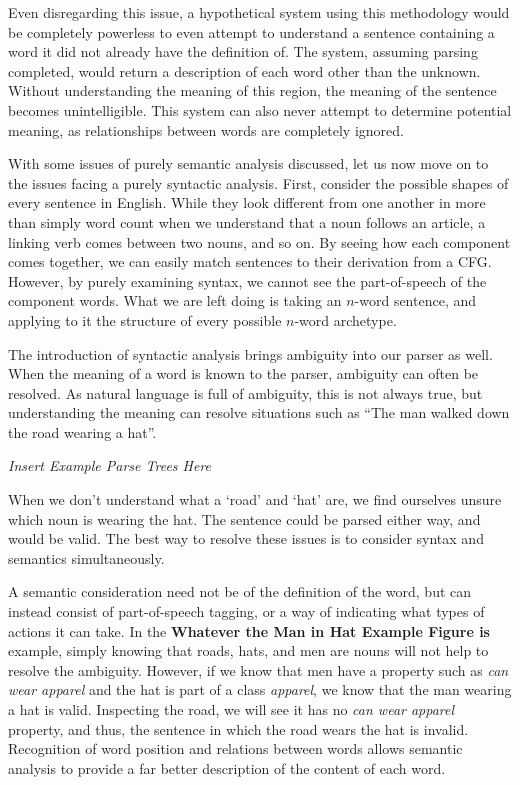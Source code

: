 Even disregarding this issue, a hypothetical system using this methodology would be completely powerless to even attempt to understand a sentence containing a word it did not already have the definition of. The system, assuming parsing completed, would return a description of each word other than the unknown. Without understanding the meaning of this region, the meaning of the sentence becomes unintelligible. This system can also never attempt to determine potential meaning, as relationships between words are completely ignored.

With some issues of purely semantic analysis discussed, let us now move on to the issues facing a purely syntactic analysis. First, consider the possible shapes of every sentence in English. While they look different from one another in more than simply word count when we understand that a noun follows an article, a linking verb comes between two nouns, and so on. By seeing how each component comes together, we can easily match sentences to their derivation from a CFG. However, by purely examining syntax, we cannot see the part-of-speech of the component words. What we are left doing is taking an $n$-word sentence, and applying to it the structure of every possible $n$-word archetype.

The introduction of syntactic analysis brings ambiguity into our parser as well. When the meaning of a word is known to the parser, ambiguity can often be resolved. As natural language is full of ambiguity, this is not always true, but understanding the meaning can resolve situations such as ``The man walked down the road wearing a hat''.

\textit{Insert Example Parse Trees Here}

When we don't understand what a `road' and `hat' are, we find ourselves unsure which noun is wearing the hat. The sentence could be parsed either way, and would be valid. The best way to resolve these issues is to consider syntax and semantics simultaneously.

A semantic consideration need not be of the definition of the word, but can instead consist of part-of-speech tagging, or a way of indicating what types of actions it can take. In the \textbf{Whatever the Man in Hat Example Figure is} example, simply knowing that roads, hats, and men are nouns will not help to resolve the ambiguity. However, if we know that men have a property such as \textit{can wear apparel} and the hat is part of a class \textit{apparel}, we know that the man wearing a hat is valid. Inspecting the road, we will see it has no \textit{can wear apparel} property, and thus, the sentence in which the road wears the hat is invalid. Recognition of word position and relations between words allows semantic analysis to provide a far better description of the content of each word.
